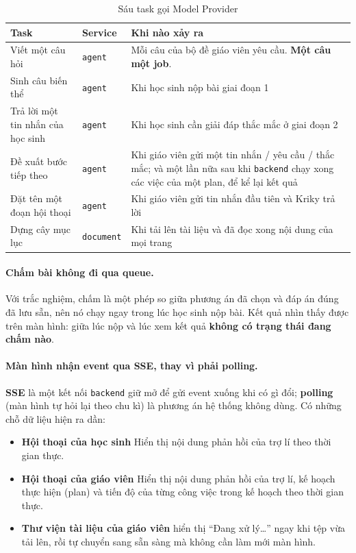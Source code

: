 \begin{table}[H]
\centering
\caption[Sáu task gọi Model Provider]{Sáu task gọi Model Provider}
\label{tab:bay-viec}
\begin{tabular}{@{}L{4.2cm}lL{7.4cm}@{}}
\toprule
\textbf{Task} & \textbf{Service} & \textbf{Khi nào xảy ra} \\
\midrule
Viết một câu hỏi & \texttt{agent} & Mỗi câu của bộ đề giáo viên yêu cầu. \textbf{Một câu một job}. \\
\addlinespace
Sinh câu biến thể & \texttt{agent} & Khi học sinh nộp bài giai đoạn 1 \\
\addlinespace
Trả lời một tin nhắn của học sinh & \texttt{agent} & Khi học sinh cần giải đáp thắc mắc ở giai đoạn 2 \\
\addlinespace
Đề xuất bước tiếp theo & \texttt{agent} & Khi giáo viên gửi một tin nhắn / yêu cầu / thắc mắc; và một lần nữa sau khi \texttt{backend} chạy xong các việc của một plan, để kể lại kết quả \\
\addlinespace
Đặt tên một đoạn hội thoại & \texttt{agent} & Khi giáo viên gửi tin nhắn đầu tiên và Kriky trả lời \\
\addlinespace
Dựng cây mục lục & \texttt{document} & Khi tải lên tài liệu và đã đọc xong nội dung của mọi trang \\
\bottomrule
\end{tabular}
\end{table}

\paragraph{Chấm bài không đi qua queue.} Với trắc nghiệm, chấm là một phép so giữa phương án
đã chọn và đáp án đúng đã lưu sẵn, nên nó chạy ngay trong lúc học sinh nộp bài. Kết quả nhìn thấy
được trên màn hình: giữa lúc nộp và lúc xem kết quả \textbf{không có trạng thái đang chấm nào}.

\paragraph{Màn hình nhận event qua SSE, thay vì phải polling.} \textbf{SSE} là một kết nối
\texttt{backend} giữ mở để gửi event xuống khi có gì đổi; \textbf{polling} (màn hình tự hỏi lại theo
chu kì) là phương án hệ thống không dùng. Có những chỗ dữ liệu hiện ra dần:

\begin{itemize}
  \item \textbf{Hội thoại của học sinh} Hiển thị nội dung phản hồi của trợ lí theo thời gian thực.
  \item \textbf{Hội thoại của giáo viên} Hiển thị nội dung phản hồi của trợ lí, kế hoạch thực hiện (plan) 
        và tiến độ của từng công việc trong kế hoạch theo thời gian thực.
  \item \textbf{Thư viện tài liệu của giáo viên} hiển thị ``Đang xử lý…'' ngay khi tệp vừa tải
        lên, rồi tự chuyển sang sẵn sàng mà không cần làm mới màn hình.
\end{itemize}

